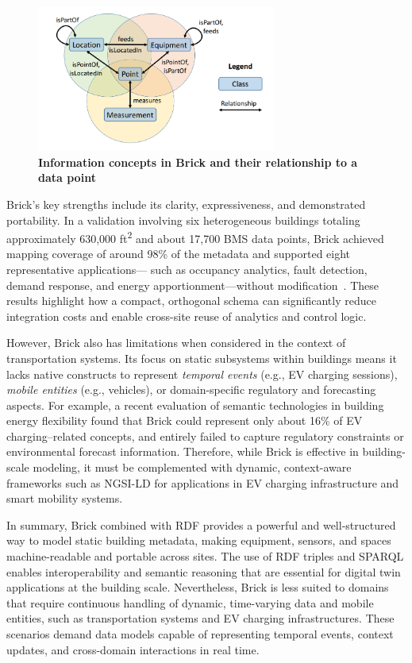 \begin{figure}[ht!]
    \centering
    \includegraphics[width=0.7\textwidth]{Images/Brick.png}
    \caption{\textbf{Information concepts in Brick and their relationship
to a data point}~\cite{Balaji2016Brick}}
    \label{fig:Brick}
\end{figure}

Brick's key strengths include its clarity, expressiveness, and
demonstrated portability. In a validation involving six heterogeneous
buildings totaling approximately 630,000 ft\textsuperscript{2} and about
17,700 BMS data points, Brick achieved mapping coverage of around
98\% of the metadata and supported eight representative applications—
such as occupancy analytics, fault detection, demand response, and
energy apportionment—without modification~\cite{Balaji2016Brick}.
These results highlight how a compact, orthogonal schema can
significantly reduce integration costs and enable cross-site reuse of
analytics and control logic.

However, Brick also has limitations when considered in the context of
transportation systems. Its focus on static subsystems within buildings
means it lacks native constructs to represent \emph{temporal events}
(e.g., EV charging sessions), \emph{mobile entities} (e.g., vehicles), or
domain-specific regulatory and forecasting aspects. For example, a
recent evaluation of semantic technologies in building energy
flexibility found that Brick could represent only about 16\% of EV
charging–related concepts, and entirely failed to capture regulatory
constraints or environmental forecast information.
Therefore, while Brick is effective in building-scale modeling, it must
be complemented with dynamic, context-aware frameworks such as
NGSI-LD for applications in EV charging infrastructure and smart
mobility systems.

In summary, Brick combined with RDF provides a powerful and
well-structured way to model static building metadata, making
equipment, sensors, and spaces machine-readable and portable across
sites. The use of RDF triples and SPARQL enables interoperability and
semantic reasoning that are essential for digital twin applications at the
building scale. Nevertheless, Brick is less suited to domains that require
continuous handling of dynamic, time-varying data and mobile entities,
such as transportation systems and EV charging infrastructures. These
scenarios demand data models capable of representing temporal events,
context updates, and cross-domain interactions in real time. 

